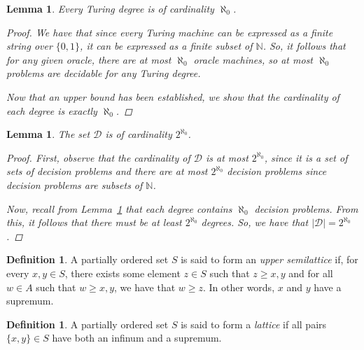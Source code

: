 \documentclass[psamsfonts]{amsart}
\newtheorem{lem}[thm]{Lemma}
\theoremstyle{definition}
\newtheorem{defn}[thm]{Definition}
\theoremstyle{remark}
\numberwithin{equation}{section}
\begin{document}
\begin{lem}
  \label{lem:deg_count}
  Every Turing degree is of cardinality $\aleph_0$.
  \begin{proof}
    We have that since every Turing machine can be expressed as a finite string over
    $\{0,1\}$, it can be expressed as a finite subset of $\mathbb{N}$. So, it follows
    that for any given oracle, there are at most $\aleph_0$ oracle machines, so
    at most $\aleph_0$ problems are decidable for any Turing degree.
    \par
    Now that an upper bound has been established,  we show that the cardinality
    of each degree is exactly $\aleph_0$.\todo{}
  \end{proof}
\end{lem}


\begin{lem}
  The set $\mathcal{D}$ is of cardinality $2^{\aleph_0}$.
  \begin{proof}
    First, observe that the cardinality of $\mathcal{D}$ is at most
    $2^{\aleph_0}$, since it is a set of sets of decision problems and there are
    at most $2^{\aleph_0}$ decision problems since decision problems are subsets
    of $\mathbb{N}$.\par Now, recall from Lemma~\ref{lem:deg_count} that each
    degree contains $\aleph_0$ decision problems. From this, it follows that
    there must be at least $2^{\aleph_0}$ degrees. So, we have that $\lvert \mathcal{D} \rvert=2^{\aleph_0}$.
  \end{proof}
\end{lem}

\begin{defn}
  A partially ordered set $S$ is said to form an \emph{upper semilattice} if, for every
 $x,y\in S$, there exists some element $z\in S$ such that $z \geq x,y$ and
 for all $w\in A$ such that $w\geq x,y$, we have that $w \geq z$. In other
 words, $x$ and $y$ have a supremum.
\end{defn}

\begin{defn}
  A partially ordered set $S$ is said to form a \emph{lattice} if all pairs
  $\{x,y\}\in S$ have both an infinum and a supremum.
\end{defn}
\end{document}
